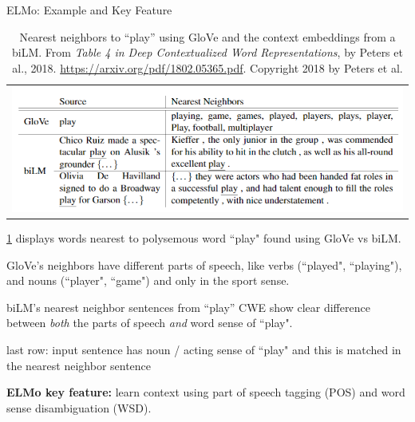 \begin{frame}{ELMo: Example and Key Feature}
    
    
    
    \begin{table}[ht!]
      \centering
      \begin{tabular}{ c }
        
        \begin{minipage}{.9\textwidth}
          \includegraphics[width=\linewidth]{imgs/table_elmoPlay.png}
        \end{minipage}
        \vspace{-7pt}
      \end{tabular}
      \caption{\linespread{0.3} \footnotesize Nearest neighbors to ``play” using GloVe and the context embeddings from a biLM. From \emph{Table 4 in Deep Contextualized Word Representations}, by Peters et al., 2018. \url{https://arxiv.org/pdf/1802.05365.pdf}. Copyright 2018 by Peters et al.}
      \label{tbl:elmoPlayExample}
      \vspace{-10pt}
    \end{table}
    
    
    \begin{itemizeSpaced}{0pt}
        
        \item \cref{tbl:elmoPlayExample} displays words nearest to polysemous word ``play" found using GloVe vs biLM. 
        
        \item GloVe's neighbors have different parts of speech, like verbs (``played", ``playing"), and nouns (``player", ``game") and only in the sport sense.
        
        
        \item biLM's nearest neighbor sentences from ``play'' CWE show clear difference between \emph{both} the parts of speech \emph{and} word sense of ``play". 
        
        \begin{itemizeSpaced}{0pt}
            \item last row: input sentence has noun / acting sense of ``play" and this is matched in the nearest neighbor sentence
        \end{itemizeSpaced}        
            
    
    \end{itemizeSpaced}
    
    \textbf{ELMo key feature: } learn context using part of speech tagging (POS) and word sense disambiguation (WSD).  
    
\end{frame}